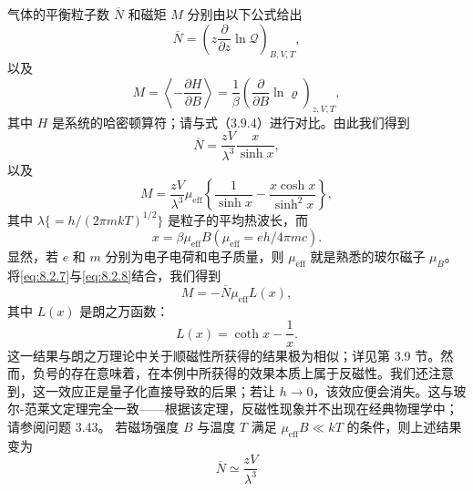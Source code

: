气体的平衡粒子数 \(\overline{N}\) 和磁矩 \(M\) 分别由以下公式给出
\begin{equation}\tag{8.2.5}\label{eq:8.2.5}
\overline { { N } } = \left( z \frac { \partial } { \partial z } \ln \mathcal { Q } \right) _ { B , V , T } ,
\end{equation}
以及
\begin{equation}\tag{8.2.6}\label{eq:8.2.6}
M = \left\langle - \frac { \partial H } { \partial B } \right\rangle = \frac { 1 } { \beta } \left( \frac { \partial } { \partial B } \ln \varrho \right) _ { z , V , T } ,
\end{equation}
其中 \(H\) 是系统的哈密顿算符；请与式（3.9.4）进行对比。由此我们得到
\begin{equation}\tag{8.2.7}\label{eq:8.2.7}
\overline { { { N } } } = \frac { z V } { \lambda ^{3} } \frac { x } { \sinh x } ,
\end{equation}
以及
\begin{equation}\tag{8.2.8}\label{eq:8.2.8}
M = \frac { z V } { \lambda ^{3} } \mu _ { \mathrm { e f f } } \left\{ \frac { 1 } { \sinh x } - \frac { x \cosh x } { \sinh ^{2} x } \right\} ,
\end{equation}
其中 \(\lambda\{=h/(2\pi mkT)^{1/2}\}\) 是粒子的平均热波长，而
\begin{equation}\tag{8.2.9}\label{eq:8.2.9}
x = \beta \mu _ { \mathrm { e f f } } B  \left( \mu _ { \mathrm { e f f } } = e h / 4 \pi m c \right) .
\end{equation}
显然，若 \(e\) 和 \(m\) 分别为电子电荷和电子质量，则 \(\mu_{\mathrm{eff}}\) 就是熟悉的玻尔磁子 \(\mu_{B}\)。将\autoref{eq:8.2.7}与\autoref{eq:8.2.8}结合，我们得到
\begin{equation}\tag{8.2.10}\label{eq:8.2.10}
M = - \overline { { { N } } } \mu _ { \mathrm { e f f } } L ( x ) ,
\end{equation}
其中 \(L(x)\) 是朗之万函数：
\begin{equation}\tag{8.2.11}\label{eq:8.2.11}
L ( x ) = \coth x - { \frac { 1 } { x } } .
\end{equation}
这一结果与朗之万理论中关于顺磁性所获得的结果极为相似；详见第 3.9 节。然而，负号的存在意味着，在本例中所获得的效果本质上属于反磁性。我们还注意到，这一效应正是量子化直接导致的后果；若让 \(h \to 0\)，该效应便会消失。这与玻尔-范莱文定理完全一致——根据该定理，反磁性现象并不出现在经典物理学中；请参阅问题 3.43。
若磁场强度 \(B\) 与温度 \(T\) 满足 \(\mu_{\mathrm{eff}}B \ll kT\) 的条件，则上述结果变为
\begin{equation}\tag{8.2.12}\label{eq:8.2.12}
\overline { { N } } \simeq \frac { z V } { \lambda ^{3} }
\end{equation}
